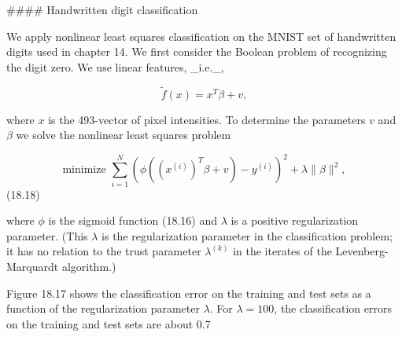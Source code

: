

#### Handwritten digit classification

We apply nonlinear least squares classification on the MNIST set of handwritten digits used in chapter 14. We first consider the Boolean problem of recognizing the digit zero. We use linear features, _i.e._,

\[\tilde{f}(x)=x^{T}\beta+v,\]

where \(x\) is the 493-vector of pixel intensities. To determine the parameters \(v\) and \(\beta\) we solve the nonlinear least squares problem

\[\text{minimize }\sum_{i=1}^{N}(\phi((x^{(i)})^{T}\beta+v)-y^{(i)})^{2}+ \lambda\|\beta\|^{2},\] (18.18)

where \(\phi\) is the sigmoid function (18.16) and \(\lambda\) is a positive regularization parameter. (This \(\lambda\) is the regularization parameter in the classification problem; it has no relation to the trust parameter \(\lambda^{(k)}\) in the iterates of the Levenberg-Marquardt algorithm.)

Figure 18.17 shows the classification error on the training and test sets as a function of the regularization parameter \(\lambda\). For \(\lambda=100\), the classification errors on the training and test sets are about 0.7%

